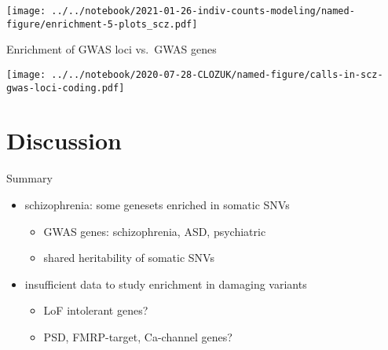 \documentclass[usenames,dvipsnames]{beamer}
\begin{document}

\begin{frame}[label=results]
\texttt{[image: ../../notebook/2021-01-26-indiv-counts-modeling/named-figure/enrichment-5-plots\_scz.pdf]}
\end{frame}

\begin{frame}{Enrichment of GWAS loci vs.~GWAS genes}
\begin{center}
\texttt{[image: ../../notebook/2020-07-28-CLOZUK/named-figure/calls-in-scz-gwas-loci-coding.pdf]}
\end{center}
\end{frame}

\section{Discussion}




\begin{frame}{Summary}
\begin{itemize}
\item schizophrenia: some genesets enriched in somatic SNVs
\begin{itemize}
	\item GWAS genes: schizophrenia, ASD, psychiatric 
        \item shared heritability of somatic SNVs
\end{itemize}
\item insufficient data to study enrichment in damaging variants
\begin{itemize}
	\item LoF intolerant genes?
	\item PSD, FMRP-target, Ca-channel genes?
\end{itemize}
\end{itemize}
\end{frame}
\end{document}
